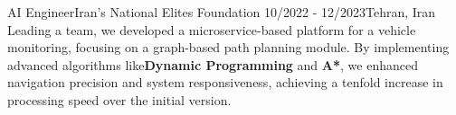 \resumeSubheadingReza
{AI Engineer}{Iran's National Elites Foundation}
{10/2022 - 12/2023}{Tehran, Iran}
 {Leading a team, we developed a microservice-based platform for a vehicle monitoring, focusing on a graph-based path planning module. By implementing advanced algorithms like\textbf{Dynamic Programming} and \textbf{A*}, we enhanced navigation precision and system responsiveness, achieving a tenfold increase in processing speed over the initial version.}
